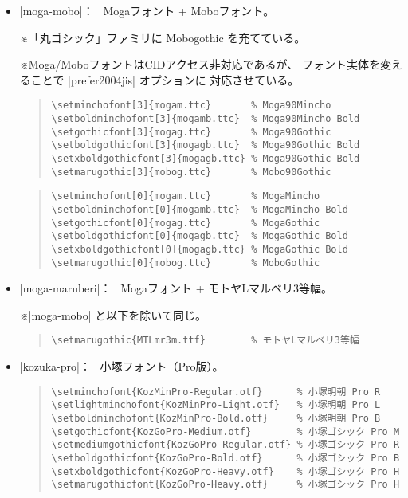 \documentclass[a4paper,uplatex]{jsarticle}
\newcommand{\Note}{\par\noindent ※}
\newcommand{\Means}{：\ }
\begin{document}
\begin{itemize}
\item |moga-mobo|\Means
   Mogaフォント + Moboフォント。
   \Note 「丸ゴシック」ファミリに Mobogothic を充てている。
   \Note Moga/MoboフォントはCIDアクセス非対応であるが、
   フォント実体を変えることで |prefer2004jis| オプションに
   対応させている。
   \par\medskip
\begin{quote}\small\begin{verbatim}
\setminchofont[3]{mogam.ttc}       % Moga90Mincho
\setboldminchofont[3]{mogamb.ttc}  % Moga90Mincho Bold
\setgothicfont[3]{mogag.ttc}       % Moga90Gothic
\setboldgothicfont[3]{mogagb.ttc}  % Moga90Gothic Bold
\setxboldgothicfont[3]{mogagb.ttc} % Moga90Gothic Bold
\setmarugothic[3]{mobog.ttc}       % Mobo90Gothic
\end{verbatim}\end{quote}
   \par\medskip
\begin{quote}\small\begin{verbatim}
\setminchofont[0]{mogam.ttc}       % MogaMincho
\setboldminchofont[0]{mogamb.ttc}  % MogaMincho Bold
\setgothicfont[0]{mogag.ttc}       % MogaGothic
\setboldgothicfont[0]{mogagb.ttc}  % MogaGothic Bold
\setxboldgothicfont[0]{mogagb.ttc} % MogaGothic Bold
\setmarugothic[0]{mobog.ttc}       % MoboGothic
\end{verbatim}\end{quote}

\item |moga-maruberi|\Means
   Mogaフォント + モトヤLマルベリ3等幅。
   \Note |moga-mobo| と以下を除いて同じ。
\begin{quote}\small\begin{verbatim}
\setmarugothic{MTLmr3m.ttf}        % モトヤLマルベリ3等幅
\end{verbatim}\end{quote}

\item |kozuka-pro|\Means
  小塚フォント（Pro版）。
\begin{quote}\small\begin{verbatim}
\setminchofont{KozMinPro-Regular.otf}      % 小塚明朝 Pro R
\setlightminchofont{KozMinPro-Light.otf}   % 小塚明朝 Pro L
\setboldminchofont{KozMinPro-Bold.otf}     % 小塚明朝 Pro B
\setgothicfont{KozGoPro-Medium.otf}        % 小塚ゴシック Pro M
\setmediumgothicfont{KozGoPro-Regular.otf} % 小塚ゴシック Pro R
\setboldgothicfont{KozGoPro-Bold.otf}      % 小塚ゴシック Pro B
\setxboldgothicfont{KozGoPro-Heavy.otf}    % 小塚ゴシック Pro H
\setmarugothicfont{KozGoPro-Heavy.otf}     % 小塚ゴシック Pro H
\end{verbatim}\end{quote}


\end{itemize}
\end{document}
